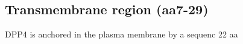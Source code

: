 \subsection{Transmembrane region (aa7-29)}

DPP4 is anchored in the plasma membrane by a sequenc 22 aa